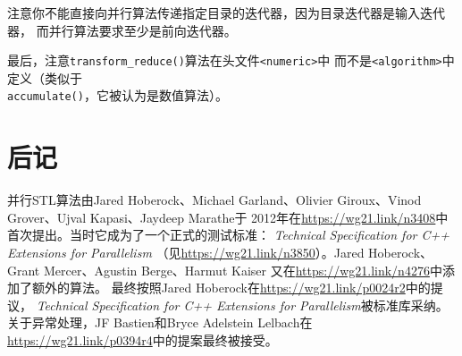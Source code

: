 注意你不能直接向并行算法传递指定目录的迭代器，因为目录迭代器是输入迭代器，
而并行算法要求至少是前向迭代器。

最后，注意\texttt{transform\_reduce()}算法在头文件\texttt{<numeric>}中
而不是\texttt{<algorithm>}中定义（类似于\\
\texttt{accumulate()}，它被认为是数值算法）。


\section{后记}
并行STL算法由Jared Hoberock、Michael Garland、Olivier Giroux、Vinod Grover、Ujval Kapasi、Jaydeep Marathe于
2012年在\url{https://wg21.link/n3408}中首次提出。当时它成为了一个正式的测试标准：
\emph{Technical Specification for C++ Extensions for Parallelism}
（见\url{https://wg21.link/n3850}）。Jared Hoberock、Grant Mercer、Agustin Berge、Harmut Kaiser
又在\url{https://wg21.link/n4276}中添加了额外的算法。
最终按照Jared Hoberock在\url{https://wg21.link/p0024r2}中的提议，
\emph{Technical Specification for C++ Extensions for Parallelism}被标准库采纳。
关于异常处理，JF Bastien和Bryce Adelstein Lelbach在\url{https://wg21.link/p0394r4}中的提案最终被接受。
